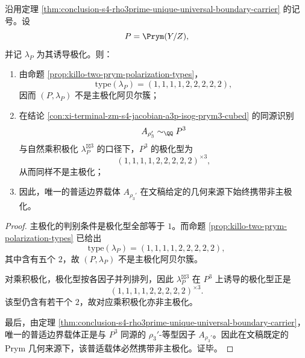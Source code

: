 \begin{theorem}[普适边界载体的非主极化刚性]\label{thm:conclusion-s4-universal-boundary-carrier-nonprincipal-polarization}
沿用定理 \ref{thm:conclusion-s4-rho3prime-unique-universal-boundary-carrier} 的记号。设
\[
P=\Prym(Y/Z),
\]
并记 \(\lambda_P\) 为其诱导极化。则：
\begin{enumerate}
  \item 由命题 \ref{prop:killo-two-prym-polarization-types}，
  \[
  \mathrm{type}(\lambda_P)=(1,1,1,1,2,2,2,2,2),
  \]
  因而 \((P,\lambda_P)\) 不是主极化阿贝尔簇；
  \item 在结论 \ref{con:xi-terminal-zm-s4-jacobian-a3p-isog-prym3-cubed} 的同源识别
  \[
  A_{\rho_3'}\sim_{\QQ}P^3
  \]
  与自然乘积极化 \(\lambda_P^{\boxtimes 3}\) 的口径下，\(P^3\) 的极化型为
  \[
  (1,1,1,1,2,2,2,2,2)^{\times 3},
  \]
  从而同样不是主极化；
  \item 因此，唯一的普适边界载体 \(A_{\rho_3'}\) 在文稿给定的几何来源下始终携带非主极化。
\end{enumerate}
\end{theorem}
\begin{proof}
主极化的判别条件是极化型全部等于 \(1\)。而命题 \ref{prop:killo-two-prym-polarization-types} 已给出
\[
\mathrm{type}(\lambda_P)=(1,1,1,1,2,2,2,2,2),
\]
其中含有五个 \(2\)，故 \((P,\lambda_P)\) 不是主极化阿贝尔簇。

对乘积极化，极化型按各因子并列排列，因此 \(\lambda_P^{\boxtimes 3}\) 在 \(P^3\) 上诱导的极化型正是
\[
(1,1,1,1,2,2,2,2,2)^{\times 3}.
\]
该型仍含有若干个 \(2\)，故对应乘积极化亦非主极化。

最后，由定理 \ref{thm:conclusion-s4-rho3prime-unique-universal-boundary-carrier}，
唯一的普适边界载体正是与 \(P^3\) 同源的 \(\rho_3'\)-等型因子 \(A_{\rho_3'}\)。因此在文稿既定的 Prym 几何来源下，该普适载体必然携带非主极化。证毕。
\end{proof}

\endinput
